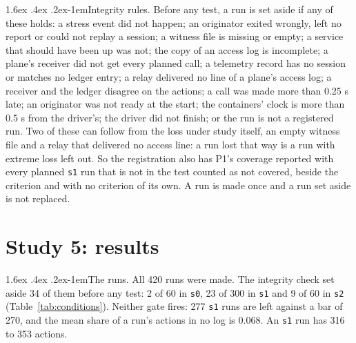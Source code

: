 \documentclass[11pt]{article}
\makeatletter
\renewcommand\paragraph{\@startsection{paragraph}{4}{\z@}%
  {1.6ex \@plus .4ex \@minus .2ex}{-1em}{\normalfont\normalsize\bfseries}}
\makeatother
\begin{document}
\paragraph{Integrity rules.} Before any test, a run is set aside if any of these holds:
a stress event did not happen; an originator exited wrongly, left no report or could not
replay a session; a witness file is missing or empty; a service that should have been up
was not; the copy of an access log is incomplete; a plane's receiver did not get every
planned call; a telemetry record has no session or matches no ledger entry; a relay
delivered no line of a plane's access log; a receiver and the ledger disagree on the
actions; a call was made more than 0.25 s late; an originator was not ready at the
start; the containers' clock is more than 0.5 s from the driver's; the driver did not
finish; or the run is not a registered run. Two of these can follow from the loss under
study itself, an empty witness file and a relay that delivered no access line: a run
lost that way is a run with extreme loss left out. So the registration also has P1's
coverage reported with every planned \texttt{s1} run that is not in the test counted as
not covered, beside the criterion and with no criterion of its own. A run is made once
and a run set aside is not replaced.

\section{Study 5: results}
\label{sec:s5results}

\paragraph{The runs.} All 420 runs were made. The integrity check set aside 34 of them
before any test: 2 of 60 in \texttt{s0}, 23 of 300 in \texttt{s1} and 9 of 60 in
\texttt{s2} (Table~\ref{tab:conditions}). Neither gate fires: 277 \texttt{s1} runs are
left against a bar of 270, and the mean share of a run's actions in no log is 0.068. An
\texttt{s1} run has 316 to 353 actions.
\end{document}
